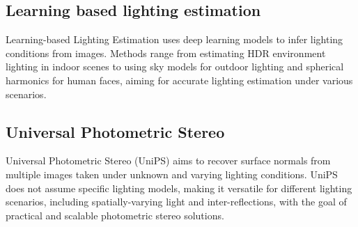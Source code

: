 \subsection{Learning based lighting estimation }
Learning-based Lighting Estimation uses deep learning models to infer lighting conditions from images. Methods range from estimating HDR environment lighting in indoor scenes to using sky models for outdoor lighting and spherical harmonics for human faces, aiming for accurate lighting estimation under various scenarios.

\subsection{Universal Photometric Stereo}
Universal Photometric Stereo (UniPS) aims to recover surface normals from multiple images taken under unknown and varying lighting conditions. UniPS does not assume specific lighting models, making it versatile for different lighting scenarios, including spatially-varying light and inter-reflections, with the goal of practical and scalable photometric stereo solutions.

